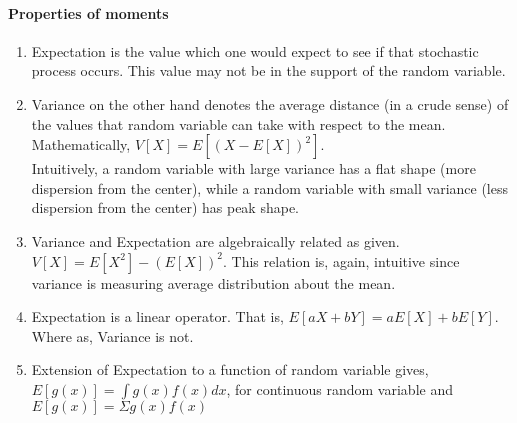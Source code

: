 \documentclass[12pt]{report} %
\begin{document}
	\paragraph*{Properties of moments}
	\begin{enumerate}
	\item Expectation is the value which one would expect to see if that stochastic process occurs. This value may not be in the support of the random variable.
	\item Variance on the other hand denotes the average distance (in a crude sense) of the values that random variable can take with respect to the mean. Mathematically, $V[X] = E[(X- E[X])^2]$.\\
	Intuitively, a random variable with large variance has a flat shape (more dispersion from the center), while a random variable with small variance (less dispersion from the center) has peak shape.
	\item Variance and Expectation are algebraically related as given. $V[X] = E[X^2] - (E[X])^2$. This relation is, again, intuitive since variance is measuring average distribution about the mean. 
	\item Expectation is a linear operator. That is, $E[aX+bY] = aE[X] + bE[Y]$. Where as, Variance is not. 
	\item Extension of Expectation to a function of random variable gives, $E[g(x)] = \int g(x)f(x)dx$, for continuous random variable and $E[g(x)] = \Sigma g(x)f(x)$
	\end{enumerate}
	
\end{document}
